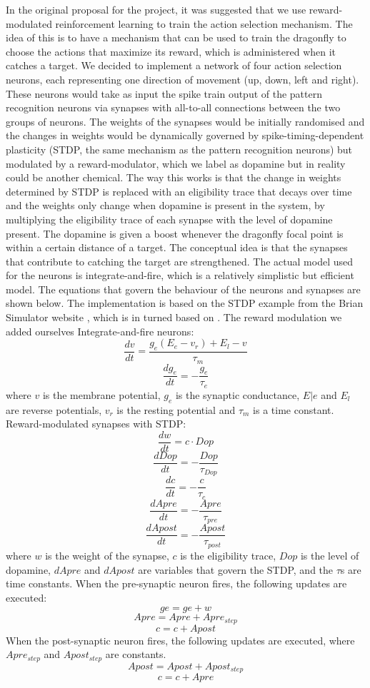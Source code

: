 \documentclass[a4paper,11pt]{article}
\begin{document}
In the original proposal for the project, it was suggested that we use reward-modulated reinforcement learning to train the action selection mechanism. The idea of this is to have a mechanism that can be used to train the dragonfly to choose the actions that maximize its reward, which is administered when it catches a target. 
\newline
\newline
	We decided to implement a network of four action selection neurons, each representing one direction of movement (up, down, left and right). These neurons would take as input the spike train output of the pattern recognition neurons via synapses with all-to-all connections between the two groups of neurons. The weights of the synapses would be initially randomised and the changes in weights would be dynamically governed by spike-timing-dependent plasticity (STDP, the same mechanism as the pattern recognition neurons) but modulated by a reward-modulator, which we label as dopamine but in reality could be another chemical. The way this works is that the change in weights determined by STDP is replaced with an eligibility trace that decays over time and the weights only change when dopamine is present in the system, by multiplying the eligibility trace of each synapse with the level of dopamine present. The dopamine is given a boost whenever the dragonfly focal point is within a certain distance of a target. The conceptual idea is that the synapses that contribute to catching the target are strengthened. The actual model used for the neurons is integrate-and-fire, which is a relatively simplistic but efficient model. The equations that govern the behaviour of the neurons and synapses are shown below. The implementation is based on the STDP example from the Brian Simulator website \cite{brian}, which is in turned based on \cite{Song2000}. The reward modulation we added ourselves
\newline
\newline
Integrate-and-fire neurons:
$$\frac{dv}{dt}=\frac{g _{e} (E_{e}-v _{r}) + E_{l} -v}{ \tau_{m}}$$
$$\frac{dg_{e}}{dt}= -\frac{g_{e}}{\tau_{e}}$$
where $v$ is the membrane potential, $g_{e}$ is the synaptic conductance, $E|{e}$ and $E_{l}$ are reverse potentials, $v_{r}$ is the resting potential and $\tau _{m}$ is a time constant.
\newline
\newline
Reward-modulated synapses with STDP:
$$\frac{dw}{dt} = c \cdot Dop$$
$$\frac{dDop}{dt}=-\frac{Dop}{\tau _{Dop}}$$
$$\frac{dc}{dt} = -\frac{c}{\tau _{c}}$$
$$\frac{dApre}{dt}=-\frac{Apre}{\tau_{pre}}$$
$$\frac{dApost}{dt}=-\frac{Apost}{\tau_{post}}$$
where $w$ is the weight of the synapse, $c$ is the eligibility trace, $Dop$ is the level of dopamine, $dApre$ and $dApost$ are variables that govern the STDP, and the $\tau$s are time constants.
When the pre-synaptic neuron fires, the following updates are executed:
$$ge = ge + w$$
$$Apre = Apre + Apre _{step}$$
$$c =c+Apost$$
When the post-synaptic neuron fires, the following updates are executed, where $Apre_{step}$ and $Apost_{step}$ are constants.
$$Apost = Apost + Apost _{step}$$
$$c =c+Apre$$
\end{document}

